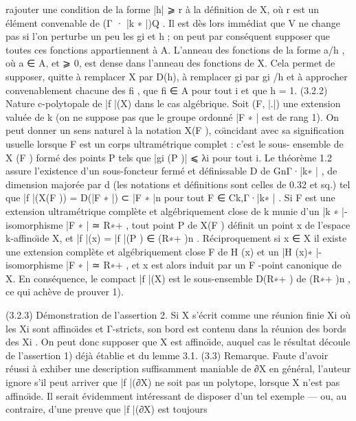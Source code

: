 \documentclass[
  10pt,
]{article}
\newenvironment{Shaded}{}{}
\newcommand{\NormalTok}[1]{#1}
\begin{document}
\begin{Shaded}
\begin{Highlighting}[]
\NormalTok{rajouter une condition de la forme |h| ⩾ r à la déﬁnition de X, où r est un élément}
\NormalTok{convenable de (Γ · |k ∗ |)Q . Il est dès lors immédiat que V ne change pas si l’on}
\NormalTok{perturbe un peu les gi et h ; on peut par conséquent supposer que toutes ces}
\NormalTok{fonctions appartiennent à A.}
\NormalTok{    L’anneau des fonctions de la forme a/h , où a ∈ A, et  ⩾ 0, est dense dans}
\NormalTok{l’anneau des fonctions de X. Cela permet de supposer, quitte à remplacer X}
\NormalTok{par D(h), à remplacer gi par gi /h et à approcher convenablement chacune des fi ,}
\NormalTok{que fi ∈ A pour tout i et que h = 1.}
\NormalTok{(3.2.2) Nature c{-}polytopale de |f |(X) dans le cas algébrique. Soit (F, |.|) une}
\NormalTok{extension valuée de k (on ne suppose pas que le groupe ordonné |F ∗ | est de}
\NormalTok{rang 1). On peut donner un sens naturel à la notation X(F ), coı̈ncidant avec sa}
\NormalTok{signiﬁcation usuelle lorsque F est un corps ultramétrique complet : c’est le sous{-}}
\NormalTok{ensemble de X (F ) formé des points P tels que |gi (P )| ⩽ λi pour tout i.}
\NormalTok{    Le théorème 1.2 assure l’existence d’un sous{-}foncteur fermé et déﬁnissable D}
\NormalTok{de GnΓ·|k∗ | , de dimension majorée par d (les notations et déﬁnitions sont celles de}
\NormalTok{0.32 et sq.) tel que}
\NormalTok{                             |f |(X(F )) = D(|F ∗ |) ⊂ |F ∗ |n}
\NormalTok{pour tout F ∈ Ck,Γ·|k∗ | .}
\NormalTok{     Si F est une extension ultramétrique complète et algébriquement close de k}
\NormalTok{munie d’un |k ∗ |{-}isomorphisme |F ∗ | ≃ R∗+ , tout point P de X(F ) déﬁnit un point x}
\NormalTok{de l’espace k{-}aﬃnoı̈de X, et |f |(x) = |f |(P ) ∈ (R∗+ )n .}
\NormalTok{     Réciproquement si x ∈ X il existe une extension complète et algébriquement}
\NormalTok{close F de H (x) et un |H (x)∗ |{-}isomorphisme |F ∗ | ≃ R∗+ , et x est alors induit par}
\NormalTok{un F {-}point canonique de X.}
\NormalTok{     En conséquence, le compact |f |(X) est le sous{-}ensemble D(R∗+ ) de (R∗+ )n , ce}
\NormalTok{qui achève de prouver 1).}
                                                                                  
\NormalTok{(3.2.3) Démonstration de l’assertion 2. Si X s’écrit comme une réunion ﬁnie Xi}
\NormalTok{où les Xi sont aﬃnoı̈des et Γ{-}stricts, son bord est contenu dans la réunion des bords}
\NormalTok{des Xi . On peut donc supposer que X est aﬃnoı̈de, auquel cas le résultat découle}
\NormalTok{de l’assertion 1) déjà établie et du lemme 3.1.}
\NormalTok{(3.3) Remarque. Faute d’avoir réussi à exhiber une description suﬃsamment}
\NormalTok{maniable de ∂X en général, l’auteur ignore s’il peut arriver que |f |(∂X) ne soit}
\NormalTok{pas un polytope, lorsque X n’est pas aﬃnoı̈de. Il serait évidemment intéressant de}
\NormalTok{disposer d’un tel exemple — ou, au contraire, d’une preuve que |f |(∂X) est toujours}
\end{Highlighting}
\end{Shaded}
\end{document}
